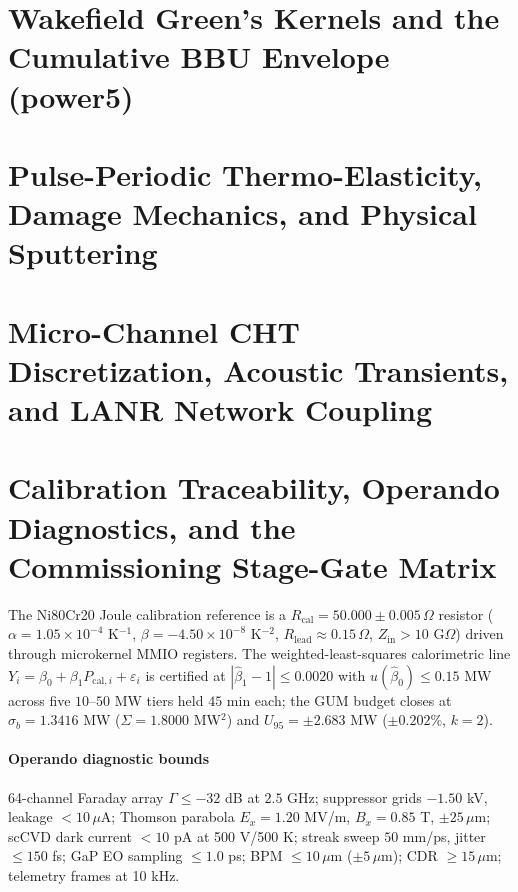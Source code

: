 \documentclass[10pt,journal,compsoc]{IEEEtran}
\begin{document}
\section{Wakefield Green's Kernels and the Cumulative BBU Envelope
  (power5)}
\label{app:bbu}
\begin{sloppypar}

\end{sloppypar}

\section{Pulse-Periodic Thermo-Elasticity, Damage Mechanics, and
  Physical Sputtering}
\label{app:fatigue_p5}
\begin{sloppypar}

\end{sloppypar}

\section{Micro-Channel CHT Discretization, Acoustic Transients, and
  LANR Network Coupling}
\label{app:cht_p5}
\begin{sloppypar}

\end{sloppypar}

\section{Calibration Traceability, Operando Diagnostics, and the
  Commissioning Stage-Gate Matrix}
\label{app:commissioning}
The Ni80Cr20 Joule calibration reference is a $R_{\mathrm{cal}} =
50.000 \pm 0.005\,\Omega$ resistor ($\alpha = 1.05\times10^{-4}$
K$^{-1}$, $\beta = -4.50\times10^{-8}$ K$^{-2}$, $R_{\mathrm{lead}}
\approx 0.15\,\Omega$, $Z_{\mathrm{in}} > 10$ G$\Omega$) driven
through microkernel MMIO registers. The weighted-least-squares
calorimetric line $Y_i = \beta_0 + \beta_1 P_{\mathrm{cal},i} +
\varepsilon_i$ is certified at $|\hat{\beta}_1 - 1| \le 0.0020$ with
$u(\hat{\beta}_0) \le 0.15$ MW across five $10$--$50$ MW tiers held
$45$ min each; the GUM budget closes at $\sigma_b = 1.3416$ MW
($\Sigma = 1.8000$ MW$^2$) and $U_{95} = \pm 2.683$ MW ($\pm 0.202\%$,
$k=2$).

\paragraph{Operando diagnostic bounds}
64-channel Faraday array $\Gamma \le -32$ dB at $2.5$ GHz; suppressor
grids $-1.50$ kV, leakage $<10\,\mu$A; Thomson parabola $E_x = 1.20$
MV/m, $B_x = 0.85$ T, $\pm 25\,\mu$m; scCVD dark current $<10$ pA at
500 V/500 K; streak sweep $50$ mm/ps, jitter $\le 150$ fs; GaP EO
sampling $\le 1.0$ ps; BPM $\le 10\,\mu$m ($\pm 5\,\mu$m); CDR
$\ge 15\,\mu$m; telemetry frames at 10 kHz.
\end{document}
